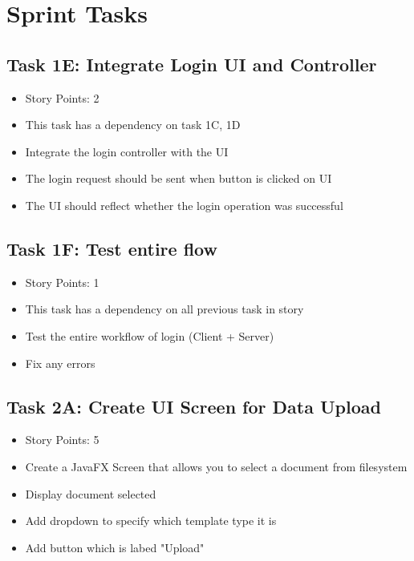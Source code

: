\documentclass[12pt]{article}
\begin{document}
\textcolor{black}{\tableofcontents}
\pagebreak


\section{Sprint Tasks}

\subsection{Task 1E: Integrate Login UI and Controller}
\begin{itemize}%
\item Story Points: 2
\item This task has a dependency on task 1C, 1D
\item Integrate the login controller with the UI
\item The login request should be sent when button is clicked on UI
\item The UI should reflect whether the login operation was successful
\end{itemize}

\subsection{Task 1F: Test entire flow}
\begin{itemize}%
\item Story Points: 1
\item This task has a dependency on all previous task in story 
\item Test the entire workflow of login (Client + Server)
\item Fix any errors 
\end{itemize}

\subsection{Task 2A: Create UI Screen for Data Upload}
\begin{itemize}%
\item Story Points: 5
\item Create a JavaFX Screen that allows you to select a document from filesystem
\item Display document selected
\item Add dropdown to specify which template type it is
\item Add button which is labed "Upload" 
\end{itemize}
\end{document}
